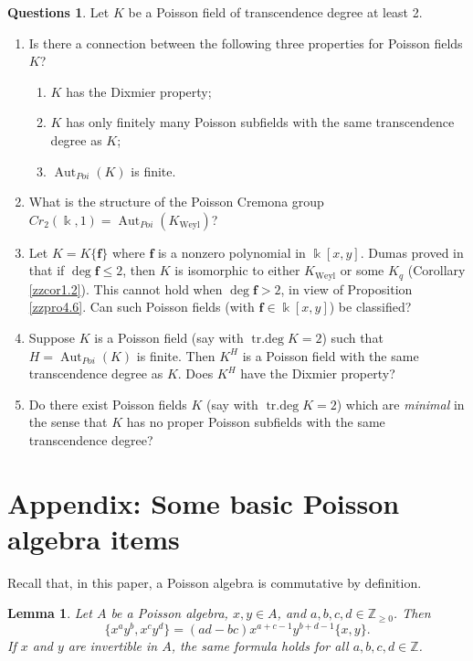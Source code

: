 \documentclass[12pt]{amsart}
\theoremstyle{plain}
\newtheorem{lemma}[theorem]{Lemma}
\numberwithin{theorem}{section}
\numberwithin{equation}{theorem}
\theoremstyle{definition}
\newtheorem{questions}[theorem]{Questions}
\newcommand{\ZZ}{\mathbb{Z}}
\DeclareMathOperator{\Aut}{Aut}
\DeclareMathOperator{\trdeg}{tr{.}deg}
\newcommand \bff {{\mathbf{f}}}
\newcommand \Znn {\ZZ_{\ge 0}}
\DeclareMathOperator{\Weyl}{Weyl}
\newcommand \Kweyl {K_{\Weyl}}
\begin{document}
\begin{questions}
\label{zzque8.7}
Let $K$ be a Poisson field of transcendence degree at least 2.
\begin{enumerate}
\item[(1)]
Is there a connection between the following three properties
for Poisson fields $K$?
\begin{enumerate}
\item[(a)] 
$K$ has the Dixmier property;
\item[(b)]
$K$ has only finitely many Poisson subfields with the same transcendence degree as $K$;
\item[(c)]
$\Aut_{Poi}(K)$ is finite.
\end{enumerate}
\item[(2)]
What is the structure of the Poisson Cremona group $Cr_2(\Bbbk,1) = \Aut_{Poi}(\Kweyl)$?
\item[(3)]
Let $K = K\{\bff\}$ where $\bff$ is a nonzero polynomial in $\Bbbk[x,y]$.  Dumas proved in \cite[Proposition, p.12]{Dumas} that if $\deg \bff \le 2$, then $K$ is isomorphic to either $\Kweyl$ or some $K_q$ (Corollary \ref{zzcor1.2}).  This cannot hold when $\deg \bff > 2$, in view of Proposition \ref{zzpro4.6}. Can such Poisson fields (with $\bff \in \Bbbk[x,y]$) be classified?
\item[(4)]
Suppose $K$ is a Poisson field (say with $\trdeg K = 2$) such that $H = \Aut_{Poi}(K)$ is finite. Then $K^H$ is a Poisson field with the same transcendence degree as $K$.  Does $K^H$ have the Dixmier property?
\item[(5)]
Do there exist Poisson fields $K$ (say with $\trdeg K = 2$) which are \emph{minimal} in the sense that $K$ has no proper Poisson subfields with the same transcendence degree? 
\end{enumerate}
\end{questions}



\section{Appendix: Some basic Poisson algebra items}
\label{zzsec9}

Recall that, in this paper, a Poisson algebra is commutative by definition.

\begin{lemma}  
\label{zzlem9.1}
Let $A$ be a Poisson algebra, $x,y \in A$, 
and $a,b,c,d \in \Znn$. Then
$$
\{ x^ay^b, x^cy^d \} 
= (ad-bc) x^{a+c-1} y^{b+d-1} \{x,y\}.
$$
If $x$ and $y$ are invertible in $A$, the 
same formula holds for all $a,b,c,d \in \ZZ$.
\end{lemma}
\end{document}
